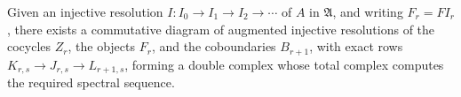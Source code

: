 Given an injective resolution $I : I_0 \to I_1 \to I_2 \to \cdots$ of $A$ in $\mathfrak{A}$, and writing $F_r = FI_r$, there exists a commutative diagram of augmented injective resolutions of the cocycles $Z_r$, the objects $F_r$, and the coboundaries $B_{r+1}$, with exact rows $K_{r,s} \to J_{r,s} \to L_{r+1,s}$, forming a double complex whose total complex computes the required spectral sequence.